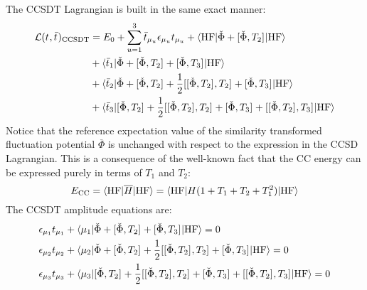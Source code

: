 The \acrshort{CCSDT} Lagrangian is built in the same exact manner:
\begin{equation}\label{eq:ccsdt-lagrangian}
 \begin{aligned}
 \mathcal{L}(t_{}, \bar{t}_{})_\mathrm{CCSDT}
&=
 E_0
 + \sum_{u=1}^{3}\bar{t}_{\mu_u}\epsilon_{\mu_u}t_{\mu_u}
 + \braket{\mathrm{HF} | \check{\Phi} + [ \check{\Phi}, T_2 ]^{} | \mathrm{HF}} \\
 &+ \braket{\bar{t}_{1} | \check{\Phi} + [ \check{\Phi}, T_2 ]^{} + [ \check{\Phi}, T_3 ]^{} | \mathrm{HF}} \\
 &+ \braket{\bar{t}_{2} | \check{\Phi} + [ \check{\Phi}, T_2 ]^{}
   +\frac{1}{2}[ [ \check{\Phi}, T_2 ]^{}, T_2 ]^{} + [ \check{\Phi}, T_3 ]^{} | \mathrm{HF}} \\
 &+ \braket{\bar{t}_{3} | [ \check{\Phi}, T_2 ]^{}
   + \frac{1}{2}[ [ \check{\Phi}, T_2 ]^{}, T_2 ]^{} + [ \check{\Phi}, T_3 ]^{}
   + [ [ \check{\Phi}, T_2 ]^{}, T_3 ]^{}
   | \mathrm{HF}}
  \end{aligned}
\end{equation}
Notice that the reference expectation value of the similarity transformed
fluctuation potential $\overline{\Phi}$ is unchanged with respect to the
expression in the \acrshort{CCSD} Lagrangian.
This is a consequence of the well-known fact that the \acrshort*{CC} energy can
be expressed purely in terms of $T_1$ and $T_2$:
\begin{equation}
E_\mathrm{CC} = \braket{\mathrm{HF} | \overline{H} | \mathrm{HF}}
=
\braket{\mathrm{HF} | H(1 + T_1 + T_2 + T_1^2) | \mathrm{HF}}
\end{equation}
The \acrshort{CCSDT} amplitude equations are:
\begin{subequations}\label{eq:ccsdt-amplitudes}
  \begin{align}
   \epsilon_{\mu_1}t_{\mu_1} &+ \braket{\mu_1 |
   \check{\Phi} + [ \check{\Phi}, T_2 ]^{} + [ \check{\Phi}, T_3 ]^{}
   | \mathrm{HF}}
             = 0 \label{eq:ccsdt-singles-amplitudes}\\
   \epsilon_{\mu_2}t_{\mu_2} &+ \braket{\mu_2 |
   \check{\Phi} + [ \check{\Phi}, T_2 ]^{}
   + \frac{1}{2}[ [ \check{\Phi}, T_2 ]^{}, T_2 ]^{} + [ \check{\Phi}, T_3 ]^{}
   | \mathrm{HF}}
             = 0 \label{eq:ccsdt-doubles-amplitudes} \\
   \epsilon_{\mu_3}t_{\mu_3} &+ \braket{\mu_3 |
   [ \check{\Phi}, T_2 ]^{}
   + \frac{1}{2}[ [ \check{\Phi}, T_2 ]^{}, T_2 ]^{} + [ \check{\Phi}, T_3 ]^{}
   + [ [ \check{\Phi}, T_2 ]^{}, T_3 ]^{}
   | \mathrm{HF}}
             = 0 \label{eq:ccsdt-triples-amplitudes}
  \end{align}
\end{subequations}
